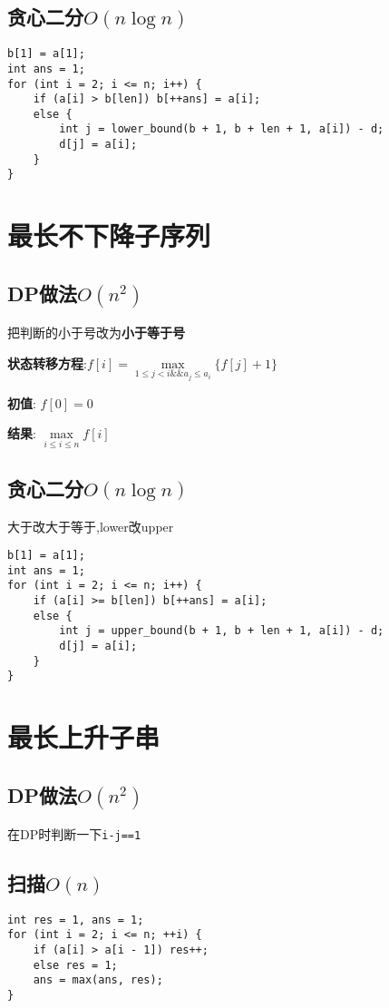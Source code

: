 \documentclass[UTF8]{ctexart}
\begin{document}
\subsection{贪心二分$O(n\log n)$}

\begin{lstlisting}
b[1] = a[1];
int ans = 1;
for (int i = 2; i <= n; i++) {
	if (a[i] > b[len]) b[++ans] = a[i];
	else {
		int j = lower_bound(b + 1, b + len + 1, a[i]) - d; 
		d[j] = a[i]; 
	}
}
\end{lstlisting}

\section{最长不下降子序列}
\subsection{DP做法$O(n^2)$}

把判断的小于号改为\textbf{小于等于号}

\textbf{状态转移方程}:$ f[i]=\max\limits_{1\leq j<i \&\& a_j \leq a_i}\{f[j] + 1\} $

\textbf{初值}: $f[0]=0$

\textbf{结果}: $ \max\limits_{i\leq i\leq n}f[i] $\\

\subsection{贪心二分$O(n\log n)$}

大于改大于等于,lower改upper

\begin{lstlisting}
b[1] = a[1];
int ans = 1;
for (int i = 2; i <= n; i++) {
	if (a[i] >= b[len]) b[++ans] = a[i];
	else {
		int j = upper_bound(b + 1, b + len + 1, a[i]) - d; 
		d[j] = a[i]; 
	}
}
\end{lstlisting}

\section{最长上升子串}

\subsection{DP做法$O(n^2)$}
在DP时判断一下\texttt{i-j==1}

\subsection{扫描$O(n)$}
\begin{lstlisting}
int res = 1, ans = 1;
for (int i = 2; i <= n; ++i) {
	if (a[i] > a[i - 1]) res++;
	else res = 1;
	ans = max(ans, res);
}
\end{lstlisting}
\end{document}
